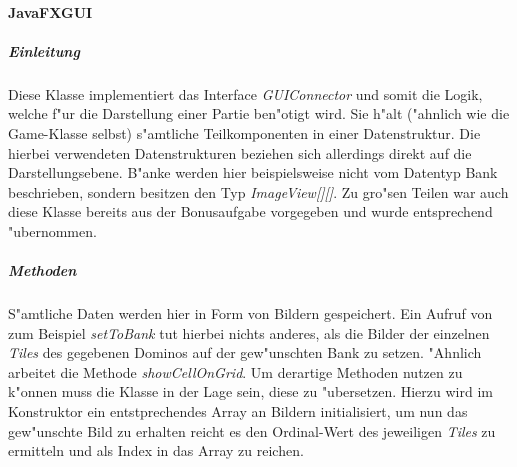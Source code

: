 \paragraph{JavaFXGUI}
\label{par:javaFXGUI}

\subparagraph{Einleitung}
Diese Klasse implementiert das Interface \emph{GUIConnector} und somit die Logik, welche f"ur die Darstellung einer Partie ben"otigt wird. Sie h"alt ("ahnlich wie die Game-Klasse selbst) s"amtliche Teilkomponenten in einer Datenstruktur. Die hierbei verwendeten Datenstrukturen beziehen sich allerdings direkt auf die Darstellungsebene. B"anke werden hier beispielsweise nicht vom Datentyp Bank beschrieben, sondern besitzen den Typ \emph{ImageView[][]}. Zu gro"sen Teilen war auch diese Klasse bereits aus der Bonusaufgabe vorgegeben und wurde entsprechend "ubernommen. 

\subparagraph{Methoden}
S"amtliche Daten werden hier in Form von Bildern gespeichert. Ein Aufruf von zum Beispiel \emph{setToBank} tut hierbei nichts anderes, als die Bilder der einzelnen \emph{Tiles} des gegebenen Dominos auf der gew"unschten Bank zu setzen. "Ahnlich arbeitet die Methode \emph{showCellOnGrid}. Um derartige Methoden nutzen zu k"onnen muss die Klasse in der Lage sein, diese zu \glqq "ubersetzen\grqq . Hierzu wird im Konstruktor ein entstprechendes Array an Bildern initialisiert, um nun das gew"unschte Bild zu erhalten reicht es den Ordinal-Wert des jeweiligen \emph{Tiles} zu ermitteln und als Index in das Array zu reichen. 